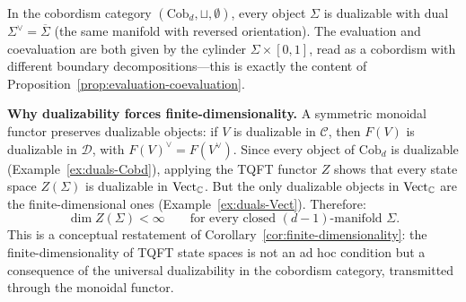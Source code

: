 \begin{example}\label{ex:duals-Cobd}
In the cobordism category $(\mathrm{Cob}_d, \sqcup, \emptyset)$, every object $\Sigma$ is dualizable with dual $\Sigma^\vee = \overline{\Sigma}$ (the same manifold with reversed orientation).  The evaluation and coevaluation are both given by the cylinder $\Sigma \times [0,1]$, read as a cobordism with different boundary decompositions---this is exactly the content of Proposition~\ref{prop:evaluation-coevaluation}.
\end{example}

\medskip
\noindent\textbf{Why dualizability forces finite-dimensionality.}
A symmetric monoidal functor preserves dualizable objects: if $V$ is dualizable in $\mathcal{C}$, then $F(V)$ is dualizable in $\mathcal{D}$, with $F(V)^\vee = F(V^\vee)$.  Since every object of $\mathrm{Cob}_d$ is dualizable (Example~\ref{ex:duals-Cobd}), applying the TQFT functor $Z$ shows that every state space $Z(\Sigma)$ is dualizable in $\mathrm{Vect}_{\mathbb{C}}$.  But the only dualizable objects in $\mathrm{Vect}_{\mathbb{C}}$ are the finite-dimensional ones (Example~\ref{ex:duals-Vect}).  Therefore:
\begin{equation}\label{eq:fd-from-dualizability}
\dim Z(\Sigma) < \infty \qquad \text{for every closed } (d{-}1)\text{-manifold } \Sigma.
\end{equation}
This is a conceptual restatement of Corollary~\ref{cor:finite-dimensionality}: the finite-dimensionality of TQFT state spaces is not an ad hoc condition but a consequence of the universal dualizability in the cobordism category, transmitted through the monoidal functor.
